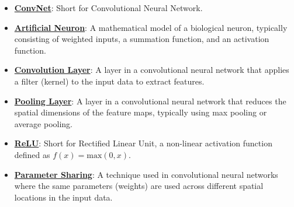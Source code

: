 \documentclass{article}%
\begin{document}
\begin{itemize}[leftmargin=*]
\item \href{https://purdue.brightspace.com/d2l/common/assets/pdfjs-d2l-dist/1.0.14-legacy/web/viewer.html?file=\%2Fcontent\%2Fenforced\%2F1095467-wl.202510.CS.24300.001\%2F09L1-cnn.pdf\%3Fou\%3D1095467\&lang=en-us\&container=d2l-fileviewer-rendered-pdf\&fullscreen=d2l-fileviewer-rendered-pdf-dialog\&height=667#page=4}{\textbf{ConvNet}}: Short for Convolutional Neural Network.%
\item \href{https://purdue.brightspace.com/d2l/common/assets/pdfjs-d2l-dist/1.0.14-legacy/web/viewer.html?file=\%2Fcontent\%2Fenforced\%2F1095467-wl.202510.CS.24300.001\%2F09L1-cnn.pdf\%3Fou\%3D1095467\&lang=en-us\&container=d2l-fileviewer-rendered-pdf\&fullscreen=d2l-fileviewer-rendered-pdf-dialog\&height=667#page=5}{\textbf{Artificial Neuron}}: A mathematical model of a biological neuron, typically consisting of weighted inputs, a summation function, and an activation function.%
\item \href{https://purdue.brightspace.com/d2l/common/assets/pdfjs-d2l-dist/1.0.14-legacy/web/viewer.html?file=\%2Fcontent\%2Fenforced\%2F1095467-wl.202510.CS.24300.001\%2F09L1-cnn.pdf\%3Fou\%3D1095467\&lang=en-us\&container=d2l-fileviewer-rendered-pdf\&fullscreen=d2l-fileviewer-rendered-pdf-dialog\&height=667#page=6}{\textbf{Convolution Layer}}: A layer in a convolutional neural network that applies a filter (kernel) to the input data to extract features.%
\item \href{https://purdue.brightspace.com/d2l/common/assets/pdfjs-d2l-dist/1.0.14-legacy/web/viewer.html?file=\%2Fcontent\%2Fenforced\%2F1095467-wl.202510.CS.24300.001\%2F09L1-cnn.pdf\%3Fou\%3D1095467\&lang=en-us\&container=d2l-fileviewer-rendered-pdf\&fullscreen=d2l-fileviewer-rendered-pdf-dialog\&height=667#page=6}{\textbf{Pooling Layer}}: A layer in a convolutional neural network that reduces the spatial dimensions of the feature maps, typically using max pooling or average pooling.%
\item \href{https://purdue.brightspace.com/d2l/common/assets/pdfjs-d2l-dist/1.0.14-legacy/web/viewer.html?file=\%2Fcontent\%2Fenforced\%2F1095467-wl.202510.CS.24300.001\%2F09L1-cnn.pdf\%3Fou\%3D1095467\&lang=en-us\&container=d2l-fileviewer-rendered-pdf\&fullscreen=d2l-fileviewer-rendered-pdf-dialog\&height=667#page=13}{\textbf{ReLU}}: Short for Rectified Linear Unit, a non-linear activation function defined as $f(x) = \text{max}(0, x)$.%
\item \href{https://purdue.brightspace.com/d2l/common/assets/pdfjs-d2l-dist/1.0.14-legacy/web/viewer.html?file=\%2Fcontent\%2Fenforced\%2F1095467-wl.202510.CS.24300.001\%2F09L1-cnn.pdf\%3Fou\%3D1095467\&lang=en-us\&container=d2l-fileviewer-rendered-pdf\&fullscreen=d2l-fileviewer-rendered-pdf-dialog\&height=667#page=12}{\textbf{Parameter Sharing}}: A technique used in convolutional neural networks where the same parameters (weights) are used across different spatial locations in the input data.%

\end{itemize}
\end{document}
